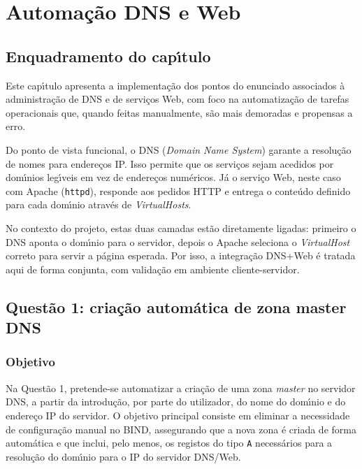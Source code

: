 ﻿\chapter{Automa\c{c}\~ao DNS e Web}
\label{cap3}

\section{Enquadramento do cap\'{\i}tulo}

Este cap\'{\i}tulo apresenta a implementa\c{c}\~ao dos pontos do enunciado associados \`a administra\c{c}\~ao de DNS e de servi\c{c}os Web, com foco na automatiza\c{c}\~ao de tarefas operacionais que, quando feitas manualmente, s\~ao mais demoradas e propensas a erro.

Do ponto de vista funcional, o DNS (\textit{Domain Name System}) garante a resolu\c{c}\~ao de nomes para endere\c{c}os IP. Isso permite que os servi\c{c}os sejam acedidos por dom\'{\i}nios leg\'{\i}veis em vez de endere\c{c}os num\'ericos. J\'a o servi\c{c}o Web, neste caso com Apache (\texttt{httpd}), responde aos pedidos HTTP e entrega o conte\'udo definido para cada dom\'{\i}nio atrav\'es de \textit{VirtualHosts}.

No contexto do projeto, estas duas camadas est\~ao diretamente ligadas: primeiro o DNS aponta o dom\'{\i}nio para o servidor, depois o Apache seleciona o \textit{VirtualHost} correto para servir a p\'agina esperada. Por isso, a integra\c{c}\~ao DNS+Web \'{e} tratada aqui de forma conjunta, com valida\c{c}\~ao em ambiente cliente-servidor.

\section{Quest\~ao 1: cria\c{c}\~ao autom\'atica de zona master DNS}
\label{sec:q1}

\subsection{Objetivo}

Na Quest\~ao 1, pretende-se automatizar a cria\c{c}\~ao de uma zona \textit{master} no servidor DNS, a partir da introdu\c{c}\~ao, por parte do utilizador, do nome do dom\'{\i}nio e do endere\c{c}o IP do servidor. O objetivo principal consiste em eliminar a necessidade de configura\c{c}\~ao manual no BIND, assegurando que a nova zona \'{e} criada de forma autom\'atica e que inclui, pelo menos, os registos do tipo \texttt{A} necess\'arios para a resolu\c{c}\~ao do dom\'{\i}nio para o IP do servidor DNS/Web.

